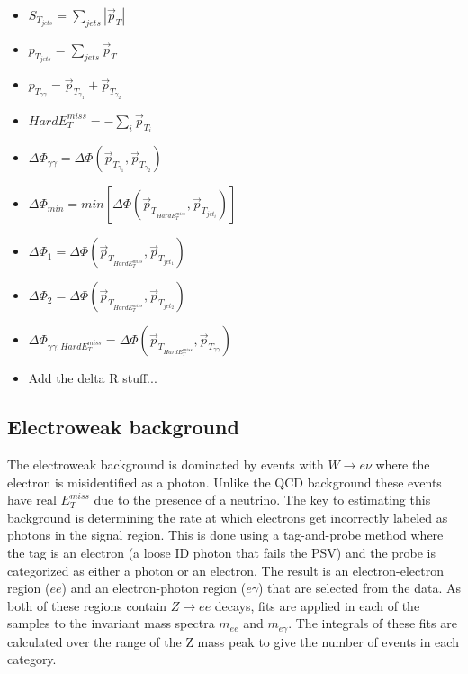 \begin{itemize}
	\item $S_{T_{jets}} = \sum_{jets}|\vec{p}_T|$
	\item $p_{T_{jets}} = \sum_{jets}\vec{p}_T$
	\item $p_{T_{\gamma \gamma}} = \vec{p}_{T_{\gamma_1}} + \vec{p}_{T_{\gamma_2}}$
	\item $HardE_T^{miss} = -\sum_{i}\vec{p}_{T_{i}}$
	\item $\Delta \Phi_{\gamma \gamma} = \Delta \Phi (\vec{p}_{T_{\gamma_1}}, \vec{p}_{T_{\gamma_2}})$
	\item $\Delta \Phi_{min} = min[\Delta \Phi (\vec{p}_{T_{HardE_T^{miss}}}, \vec{p}_{T_{jet_i}})]$
	\item $\Delta \Phi_{1} = \Delta \Phi (\vec{p}_{T_{HardE_T^{miss}}}, \vec{p}_{T_{jet_1}})$
	\item $\Delta \Phi_{2} = \Delta \Phi (\vec{p}_{T_{HardE_T^{miss}}}, \vec{p}_{T_{jet_2}})$
	\item $\Delta \Phi_{\gamma \gamma, HardE_T^{miss}} = \Delta \Phi (\vec{p}_{T_{HardE_T^{miss}}}, \vec{p}_{T_{\gamma \gamma}})$
	\item Add the delta R stuff...
\end{itemize}



\subsection{Electroweak background}
The electroweak background is dominated by events with $W \rightarrow e \nu$ where the electron is misidentified as a photon.  Unlike the QCD background these events have  real $E^{miss}_T$ due to the presence of a neutrino.  The key to estimating this background is determining the rate at which electrons get incorrectly labeled as photons in the signal region.  This is done using a tag-and-probe method where the tag is an electron (a loose ID photon that fails the PSV) and the probe is categorized as either a photon or an electron.  The result is an electron-electron region ($ee$) and an electron-photon region ($e\gamma$) that are selected from the data.    As both of these regions contain $Z\rightarrow ee$ decays, fits are applied in each of the samples to the invariant mass spectra $m_{ee}$ and $m_{e\gamma}$.  The integrals of these fits are calculated over the range of the Z mass peak to give the number of events in each category.  





